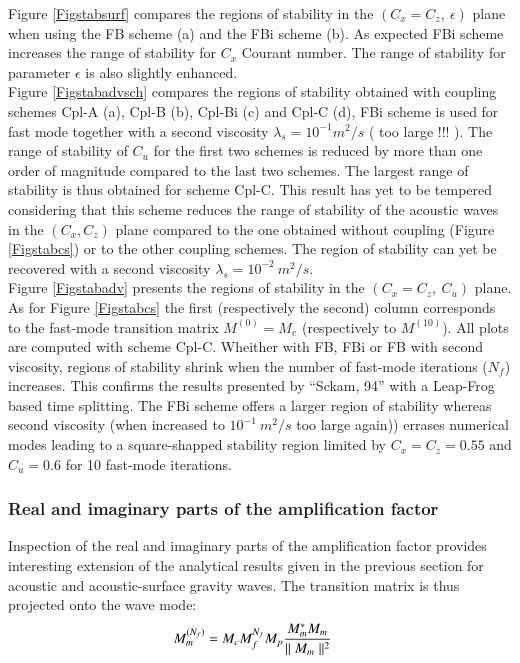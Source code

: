\documentclass[a4paper,11pt]{article}
\begin{document}
Figure \ref{Figstabsurf} compares the regions of stability in the  $(C_x=C_z,\ \epsilon)$ plane when using the FB scheme (a) and the FBi scheme (b). As expected FBi scheme increases the range of stability for $C_x$ Courant number. The range of stability for parameter $\epsilon$ is also slightly enhanced.\\

Figure \ref{Figstabadvsch} compares the regions of stability obtained with coupling schemes Cpl-A (a),  Cpl-B (b), Cpl-Bi (c) and Cpl-C (d), FBi scheme is used for fast mode together with a second viscosity $\lambda_s=10^{-1} m^2/s$ (\color{red} too large !!! \color{black}). The range of stability of $C_u$ for the first two schemes is reduced by more than one order of magnitude compared to the last two schemes. The largest range of stability is thus obtained for scheme Cpl-C. This result has yet to be tempered considering that this scheme reduces the range of stability of the acoustic waves in the $(C_x, C_z)$ plane compared to the one obtained without coupling (Figure \ref{Figstabcs}) or to the other coupling schemes. The region of stability can yet be recovered with a second viscosity $\lambda_s=10^{-2}\ m^2/s$.\\

Figure \ref{Figstabadv} presents the regions of stability in the $(C_x=C_z,\ C_u)$ plane. As for Figure \ref{Figstabcs} the first (respectively the second) column corresponds to the fast-mode transition matrix $M^{(0)}=M_e$ (respectively to $M^{(10)}$). All plots are computed with scheme Cpl-C. Wheither with FB, FBi or FB with second viscosity, regions  of stability shrink when the number of fast-mode iterations ($N_f$) increases. This confirms the results presented by ``Sckam, 94'' with a Leap-Frog based time splitting. The FBi scheme offers a larger region of stability whereas second viscosity (when increased to $10^{-1}\ m^2/s$ \color{red} too large again\color{black})) errases numerical modes leading to a square-shapped stability region limited by $C_x = C_z = 0.55$ and $C_u = 0.6$ for 10 fast-mode iterations.

\subsubsection{Real and imaginary parts of the amplification factor}

Inspection of the real and imaginary parts of the amplification factor provides interesting extension of the analytical results given in the previous section for acoustic and acoustic-surface gravity waves. The transition matrix is thus projected onto the wave mode:
\begin{equation}
   \begin{split}
    \displaystyle
     & M_{m}^{(N_f)} = M_c M_f^{N_f} M_p \frac{M_m^* M_m}{\parallel M_m \parallel^2}
   \end{split}
\end{equation}
\end{document}
